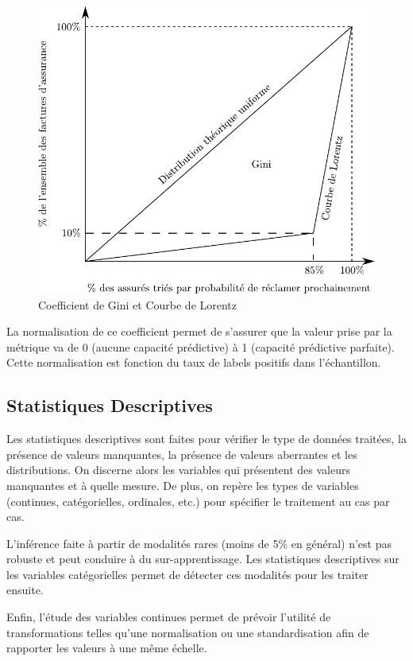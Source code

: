 \documentclass[french]{article}
\begin{document}
\begin{multicols}{2}
\begin{figure}[H] \centering
  \includegraphics[width = \columnwidth]{img/gini}
  \caption{Coefficient de Gini et Courbe de Lorentz}
\end{figure}


La normalisation de ce coefficient permet de s'assurer que la valeur prise par la métrique va de 0 (aucune capacité prédictive) à 1 (capacité prédictive parfaite). Cette normalisation est fonction du taux de labels positifs dans l'échantillon.

\subsection{Statistiques Descriptives}

Les statistiques descriptives sont faites pour vérifier le type de données traitées, la présence de valeurs manquantes, la présence de valeurs aberrantes et les distributions. On discerne alors les variables qui présentent des valeurs manquantes et à quelle mesure. De plus, on repère les types de variables (continues, catégorielles, ordinales, etc.) pour spécifier le traitement au cas par cas.

L'inférence faite à partir de modalités rares (moins de 5\% en général) n'est pas robuste et peut conduire à du sur-apprentissage. Les statistiques descriptives sur les variables catégorielles permet de détecter ces modalités pour les traiter ensuite.

Enfin, l'étude des variables continues permet de prévoir l'utilité de transformations telles qu'une normalisation ou une standardisation afin de rapporter les valeurs à une même échelle.


\end{multicols}
\end{document}
